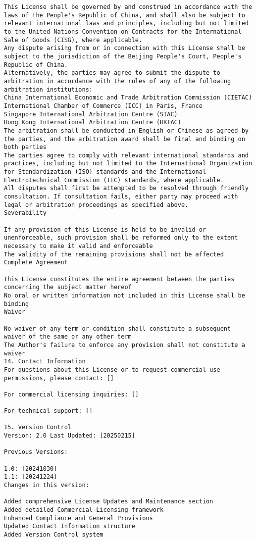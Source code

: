 \begin{verbatim}
This License shall be governed by and construed in accordance with the laws of the People's Republic of China, and shall also be subject to relevant international laws and principles, including but not limited to the United Nations Convention on Contracts for the International Sale of Goods (CISG), where applicable.
Any dispute arising from or in connection with this License shall be subject to the jurisdiction of the Beijing People's Court, People's Republic of China.
Alternatively, the parties may agree to submit the dispute to arbitration in accordance with the rules of any of the following arbitration institutions:
China International Economic and Trade Arbitration Commission (CIETAC)
International Chamber of Commerce (ICC) in Paris, France
Singapore International Arbitration Centre (SIAC)
Hong Kong International Arbitration Centre (HKIAC)
The arbitration shall be conducted in English or Chinese as agreed by the parties, and the arbitration award shall be final and binding on both parties
The parties agree to comply with relevant international standards and practices, including but not limited to the International Organization for Standardization (ISO) standards and the International Electrotechnical Commission (IEC) standards, where applicable.
All disputes shall first be attempted to be resolved through friendly consultation. If consultation fails, either party may proceed with legal or arbitration proceedings as specified above.
Severability

If any provision of this License is held to be invalid or unenforceable, such provision shall be reformed only to the extent necessary to make it valid and enforceable
The validity of the remaining provisions shall not be affected
Complete Agreement

This License constitutes the entire agreement between the parties concerning the subject matter hereof
No oral or written information not included in this License shall be binding
Waiver

No waiver of any term or condition shall constitute a subsequent waiver of the same or any other term
The Author's failure to enforce any provision shall not constitute a waiver
14. Contact Information
For questions about this License or to request commercial use permissions, please contact: []

For commercial licensing inquiries: []

For technical support: []

15. Version Control
Version: 2.0 Last Updated: [20250215]

Previous Versions:

1.0: [20241030]
1.1: [20241224]
Changes in this version:

Added comprehensive License Updates and Maintenance section
Added detailed Commercial Licensing framework
Enhanced Compliance and General Provisions
Updated Contact Information structure
Added Version Control system
\end{verbatim}